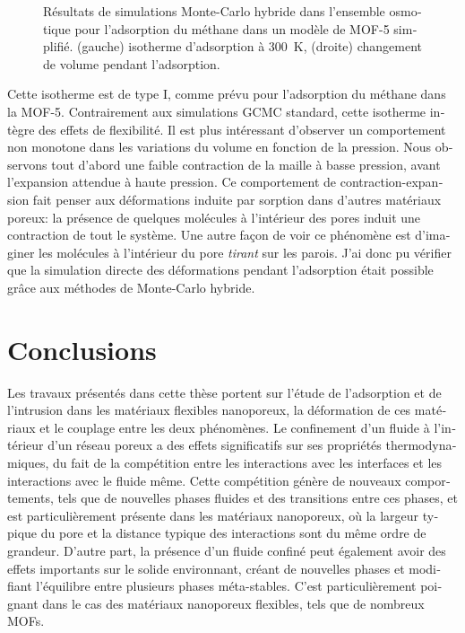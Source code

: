 \documentclass[thesis]{subfiles}
\begin{document}
\begin{otherlanguage}{french}
\begin{figure}[ht]
    \centering
    
    \caption{Résultats de simulations Monte-Carlo hybride dans l'ensemble
    osmotique pour l'adsorption du méthane dans un modèle de MOF-5 simplifié.
    (gauche) isotherme d'adsorption à \SI{300}{K}, (droite) changement de volume
    pendant l'adsorption.}
    \label{fig:fr:hmc-mof5}
\end{figure}

Cette isotherme est de type I, comme prévu pour l'adsorption du méthane dans la
MOF-5. Contrairement aux simulations GCMC standard, cette isotherme intègre des
effets de flexibilité. Il est plus intéressant d'observer un comportement non
monotone dans les variations du volume en fonction de la pression. Nous
observons tout d'abord une faible contraction de la maille à basse pression,
avant l'expansion attendue à haute pression. Ce comportement de
contraction-expansion fait penser aux déformations induite par sorption dans
d'autres matériaux poreux\cite{Balzer2013, Mouhat2015}: la présence de quelques
molécules à l'intérieur des pores induit une contraction de tout le système. Une
autre façon de voir ce phénomène est d'imaginer les molécules à l'intérieur du
pore \emph{tirant} sur les parois. J'ai donc pu vérifier que la simulation
directe des déformations pendant l'adsorption était possible grâce aux méthodes
de Monte-Carlo hybride.

\clearpage
\section*{Conclusions}

Les travaux présentés dans cette thèse portent sur l'étude de l'adsorption et de
l'intrusion dans les matériaux flexibles nanoporeux, la déformation de ces
matériaux et le couplage entre les deux phénomènes. Le confinement d'un fluide à
l'intérieur d'un réseau poreux a des effets significatifs sur ses propriétés
thermodynamiques, du fait de la compétition entre les interactions avec les
interfaces et les interactions avec le fluide même. Cette compétition génère de
nouveaux comportements, tels que de nouvelles phases fluides et des transitions
entre ces phases, et est particulièrement présente dans les matériaux
nanoporeux, où la largeur typique du pore et la distance typique des
interactions sont du même ordre de grandeur. D'autre part, la présence d'un
fluide confiné peut également avoir des effets importants sur le solide
environnant, créant de nouvelles phases et modifiant l'équilibre entre plusieurs
phases méta-stables. C'est particulièrement poignant dans le cas des matériaux
nanoporeux flexibles, tels que de nombreux MOFs.


\end{otherlanguage}
\end{document}
